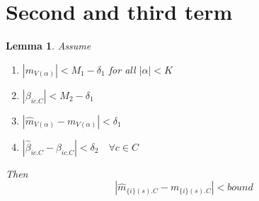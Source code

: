 \documentclass[]{article}
\newtheorem{lemma}{Lemma}
\begin{document}
\section{Second and third term}
\begin{lemma}
Assume
\begin{enumerate}
\item $|m_{V(\alpha)}| < M_1 - \delta_1 $ for all $|\alpha| < K$
\item  $|\beta_{ic.C}| < M_2 - \delta_1 $
\item $|\hat m_{V(\alpha)} - m_{V(\alpha)}| < \delta_1 $
\item$|\hat \beta_{ic.C} - \beta_{ic.C}| < \delta_2 \quad \forall c \in C$
\end{enumerate} 

Then
\[|\hat m_{\{i\}(s).C} - m_{\{i\}(s).C}|  < bound\]
\end{lemma}
\end{document}
